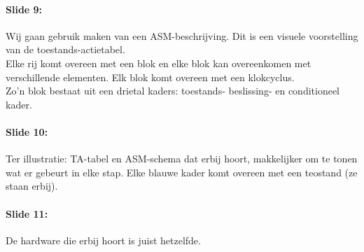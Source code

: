 \documentclass[10pt,a4paper]{book}
\begin{document}
\paragraph{Slide 9:} Wij gaan gebruik maken van een ASM-beschrijving. Dit is een visuele voorstelling van de toestands-actietabel.\\
Elke rij komt overeen met een blok en elke blok kan overeenkomen met verschillende elementen. Elk blok komt overeen met een klokcyclus.\\
Zo'n blok bestaat uit een drietal kaders: toestands- beslissing- en conditioneel kader.

\paragraph{Slide 10:} Ter illustratie: TA-tabel en ASM-schema dat erbij hoort, makkelijker om te tonen wat er gebeurt in elke stap. Elke blauwe kader komt overeen met een teostand (ze staan erbij). 

\paragraph{Slide 11:} De hardware die erbij hoort is juist hetzelfde.
\end{document}
